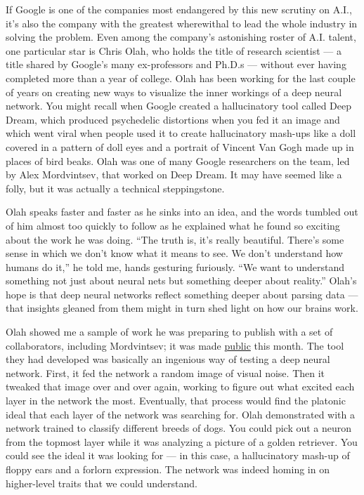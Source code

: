 If Google is one of the companies most endangered by this new scrutiny
on A.I., it's also the company with the greatest wherewithal to lead the
whole industry in solving the problem. Even among the company's
astonishing roster of A.I. talent, one particular star is Chris Olah,
who holds the title of research scientist --- a title shared by Google's
many ex-professors and Ph.D.s --- without ever having completed more
than a year of college. Olah has been working for the last couple of
years on creating new ways to visualize the inner workings of a deep
neural network. You might recall when Google created a hallucinatory
tool called Deep Dream, which produced psychedelic distortions when you
fed it an image and which went viral when people used it to create
hallucinatory mash-ups like a doll covered in a pattern of doll eyes and
a portrait of Vincent Van Gogh made up in places of bird beaks. Olah was
one of many Google researchers on the team, led by Alex Mordvintsev,
that worked on Deep Dream. It may have seemed like a folly, but it was
actually a technical steppingstone.

Olah speaks faster and faster as he sinks into an idea, and the words
tumbled out of him almost too quickly to follow as he explained what he
found so exciting about the work he was doing. ``The truth is, it's
really beautiful. There's some sense in which we don't know what it
means to see. We don't understand how humans do it,'' he told me, hands
gesturing furiously. ``We want to understand something not just about
neural nets but something deeper about reality.'' Olah's hope is that
deep neural networks reflect something deeper about parsing data ---
that insights gleaned from them might in turn shed light on how our
brains work.

Olah showed me a sample of work he was preparing to publish with a set
of collaborators, including Mordvintsev; it was made
\href{https://distill.pub/2017/feature-visualization/}{public} this
month. The tool they had developed was basically an ingenious way of
testing a deep neural network. First, it fed the network a random image
of visual noise. Then it tweaked that image over and over again, working
to figure out what excited each layer in the network the most.
Eventually, that process would find the platonic ideal that each layer
of the network was searching for. Olah demonstrated with a network
trained to classify different breeds of dogs. You could pick out a
neuron from the topmost layer while it was analyzing a picture of a
golden retriever. You could see the ideal it was looking for --- in this
case, a hallucinatory mash-up of floppy ears and a forlorn expression.
The network was indeed homing in on higher-level traits that we could
understand.


